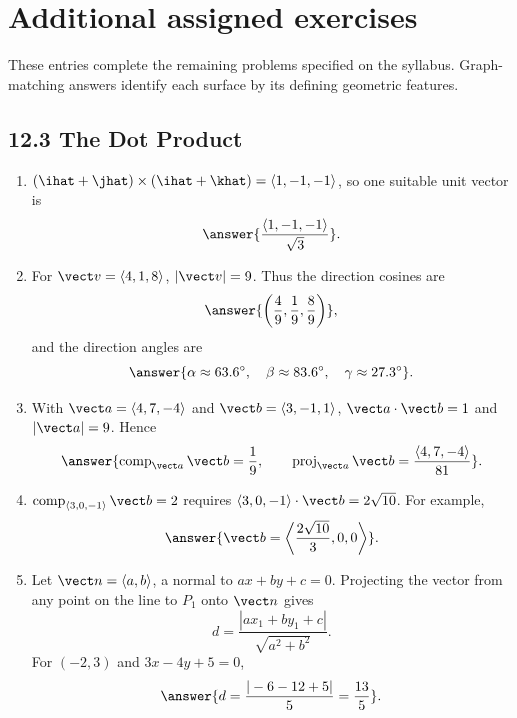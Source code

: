 \newpage
\section*{Additional assigned exercises}
\noindent These entries complete the remaining problems specified on the syllabus. Graph-matching answers identify each surface by its defining geometric features.

\subsection*{12.3 The Dot Product}
\begin{enumerate}[label=\textbf{\arabic*.}, start=27]
\item $(\ihat+\jhat)\times(\ihat+\khat)=\langle1,-1,-1\rangle$, so one suitable unit vector is \[\answer{\frac{\langle1,-1,-1\rangle}{\sqrt3}}.\]
\setcounter{enumi}{32}
\item For $\vect v=\langle4,1,8\rangle$, $|\vect v|=9$. Thus the direction cosines are \[\answer{\left(\frac49,\frac19,\frac89\right)},\] and the direction angles are \[\answer{\alpha\approx63.6^\circ,\quad\beta\approx83.6^\circ,\quad\gamma\approx27.3^\circ}.\]
\setcounter{enumi}{40}
\item With $\vect a=\langle4,7,-4\rangle$ and $\vect b=\langle3,-1,1\rangle$, $\vect a\cdot\vect b=1$ and $|\vect a|=9$. Hence \[\answer{\operatorname{comp}_{\vect a}\vect b=\frac19,\qquad \operatorname{proj}_{\vect a}\vect b=\frac{\langle4,7,-4\rangle}{81}}.\]
\setcounter{enumi}{46}
\item $\operatorname{comp}_{\langle3,0,-1\rangle}\vect b=2$ requires $\langle3,0,-1\rangle\cdot\vect b=2\sqrt{10}$. For example, \[\answer{\vect b=\left\langle\frac{2\sqrt{10}}3,0,0\right\rangle}.\]
\setcounter{enumi}{52}
\item Let $\vect n=\langle a,b\rangle$, a normal to $ax+by+c=0$. Projecting the vector from any point on the line to $P_1$ onto $\vect n$ gives \[d=\frac{|ax_1+by_1+c|}{\sqrt{a^2+b^2}}.\] For $(-2,3)$ and $3x-4y+5=0$, \[\answer{d=\frac{|-6-12+5|}{5}=\frac{13}{5}}.\]
\end{enumerate}

